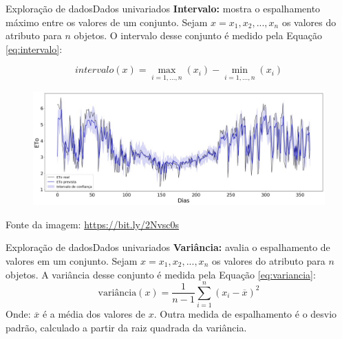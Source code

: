 \documentclass[t]{beamer}
\begin{document}

\begin{ftst}{Exploração de dados}{Dados univariados}
\small
\textbf{Intervalo:} mostra o espalhamento máximo entre os valores de um conjunto.
\vone
Sejam $x = {x_1, x_2, ..., x_n}$ os valores do atributo para $n$ objetos. O intervalo desse conjunto é medido pela Equação \ref{eq:intervalo}:

\begin{equation}
    \label{eq:intervalo}
    intervalo(x) = \max_{i=1,...,n} (x_i) - \min_{i=1,...,n} (x_i)
\end{equation}

\begin{figure}
    \centering
    \includegraphics[scale=0.33]{Figuras/ECNN3_interval_2013.jpg}
\end{figure}
\scriptsize
Fonte da imagem: \href{https://bit.ly/2Nvsc0s}{https://bit.ly/2Nvsc0s}
\end{ftst}


\begin{ftst}{Exploração de dados}{Dados univariados}
\textbf{Variância:} avalia o espalhamento de valores em um conjunto.
\vone
Sejam $x = {x_1, x_2, ..., x_n}$ os valores do atributo para $n$ objetos. A variância desse conjunto é medida pela Equação \ref{eq:variancia}:
\vone
\begin{equation}
    \label{eq:variancia}
    \text{variância}(x) = \frac{1}{n-1} \sum_{i=1}^{n}(x_i - \overline{x})^2
\end{equation}
\vone
Onde: $\overline{x}$ é a média dos valores de $x$.
\vone
Outra medida de espalhamento é o desvio padrão, calculado a partir da raiz quadrada da variância.

\end{ftst}

\end{document}
